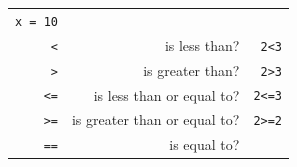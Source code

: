 \documentclass[12pt,]{krantz}
\begin{document}
\begin{longtable}[]{@{}rrr@{}}
\begin{minipage}[t]{0.30\columnwidth}
\texttt{x\ =\ 10}\strut
\end{minipage}\tabularnewline
\begin{minipage}[t]{0.30\columnwidth}\raggedleft
\texttt{\textless{}}\strut
\end{minipage} & \begin{minipage}[t]{0.30\columnwidth}\raggedleft
is less than?\strut
\end{minipage} & \begin{minipage}[t]{0.30\columnwidth}\raggedleft
\texttt{2\textless{}3}\strut
\end{minipage}\tabularnewline
\begin{minipage}[t]{0.30\columnwidth}\raggedleft
\texttt{\textgreater{}}\strut
\end{minipage} & \begin{minipage}[t]{0.30\columnwidth}\raggedleft
is greater than?\strut
\end{minipage} & \begin{minipage}[t]{0.30\columnwidth}\raggedleft
\texttt{2\textgreater{}3}\strut
\end{minipage}\tabularnewline
\begin{minipage}[t]{0.30\columnwidth}\raggedleft
\texttt{\textless{}=}\strut
\end{minipage} & \begin{minipage}[t]{0.30\columnwidth}\raggedleft
is less than or equal to?\strut
\end{minipage} & \begin{minipage}[t]{0.30\columnwidth}\raggedleft
\texttt{2\textless{}=3}\strut
\end{minipage}\tabularnewline
\begin{minipage}[t]{0.30\columnwidth}\raggedleft
\texttt{\textgreater{}=}\strut
\end{minipage} & \begin{minipage}[t]{0.30\columnwidth}\raggedleft
is greater than or equal to?\strut
\end{minipage} & \begin{minipage}[t]{0.30\columnwidth}\raggedleft
\texttt{2\textgreater{}=2}\strut
\end{minipage}\tabularnewline
\begin{minipage}[t]{0.30\columnwidth}\raggedleft
\texttt{==}\strut
\end{minipage} & \begin{minipage}[t]{0.30\columnwidth}\raggedleft
is equal to?\strut
\end{minipage} & \begin{minipage}[t]{0.30\columnwidth}\raggedleft

\end{minipage}
\end{longtable}
\end{document}
